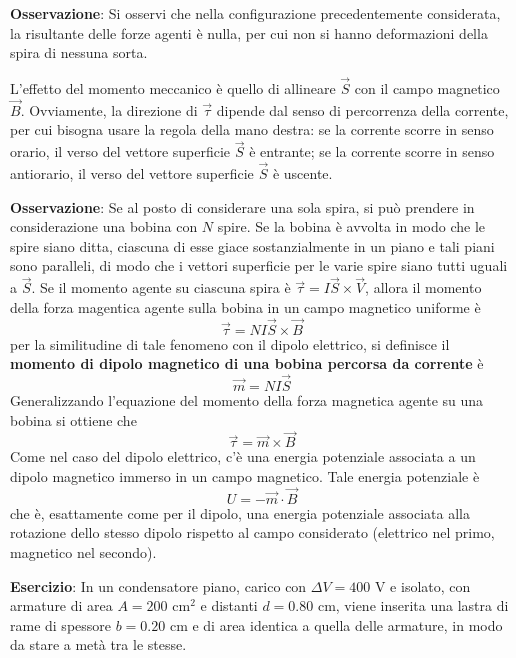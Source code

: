 \documentclass[a4paper]{extarticle}
\begin{document}
\vspace{1em}
\noindent
\textbf{Osservazione}: Si osservi che nella configurazione precedentemente considerata, la risultante delle forze agenti è nulla, per cui non si hanno deformazioni della spira di nessuna sorta.

\vspace{1em}
\noindent
L'effetto del momento meccanico è quello di allineare $\vec S$ con il campo magnetico $\vec B$. Ovviamente, la direzione di $\vec \tau$ dipende dal senso di percorrenza della corrente, per cui bisogna usare la regola della mano destra: se la corrente scorre in senso orario, il verso del vettore superficie $\vec S$ è entrante; se la corrente scorre in senso antiorario, il verso del vettore superficie $\vec S$ è uscente.

\vspace{1em}
\noindent
\textbf{Osservazione}: Se al posto di considerare una sola spira, si può prendere in considerazione una bobina con $N$ spire. Se la bobina è avvolta in modo che le spire siano ditta, ciascuna di esse giace sostanzialmente in un piano e tali piani sono paralleli, di modo che i vettori superficie per le varie spire siano tutti uguali a $\vec S$. Se il momento agente su ciascuna spira è $\vec \tau = I \vec S \times \vec V$, allora il momento della forza magentica agente sulla bobina in un campo magnetico uniforme è
\[\vec \tau = N I \vec S \times \vec B\]
per la similitudine di tale fenomeno con il dipolo elettrico, si definisce il \textbf{momento di dipolo magnetico di una bobina percorsa da corrente} è
\[\vec m = NI \vec S\]
Generalizzando l'equazione del momento della forza magnetica agente su una bobina si ottiene che 
\[\vec \tau = \vec m \times \vec B\]
Come nel caso del dipolo elettrico, c'è una energia potenziale associata a un dipolo magnetico immerso in un campo magnetico. Tale energia potenziale è
\[U = - \vec m \cdot \vec B\]
che è, esattamente come per il dipolo, una energia potenziale associata alla rotazione dello stesso dipolo rispetto al campo considerato (elettrico nel primo, magnetico nel secondo).

\vspace{1em}
\noindent
\textbf{Esercizio}: In un condensatore piano, carico con $\Delta V=400$ V e isolato, con armature di area $A=200$ cm$^2$ e distanti $d=0.80$ cm, viene inserita una lastra di rame di spessore $b=0.20$ cm e di area identica a quella delle armature, in modo da stare a metà tra le stesse.
\end{document}
